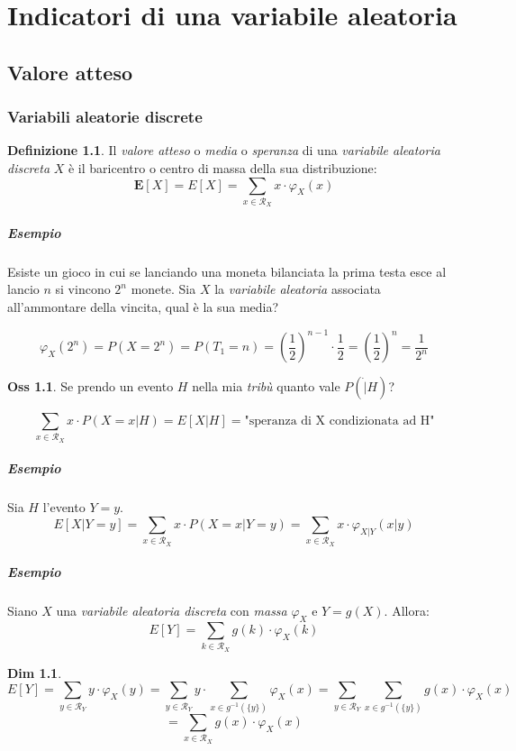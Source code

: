 \documentclass[12pt, a4paper]{report}
\theoremstyle{definition}
\newtheorem{definition}{Definizione}[section]
\newtheorem*{demonstration}{Dim}
\newtheorem*{observation}{Oss}
\DeclareRobustCommand{\supp}{\mathcal{R}}%
\begin{document}
\chapter{Indicatori di una variabile aleatoria}

\section{Valore atteso}
\subsection{Variabili aleatorie discrete}

\begin{definition}
	Il \emph{valore atteso} o \emph{media} o \emph{speranza} di una \emph{variabile
	aleatoria discreta} $X$ è il baricentro o centro di massa della sua
	distribuzione:
	\[\textbf{E}[X]=E[X]=\sum_{x\in\supp_X}x\cdot \varphi_X(x)\]
\end{definition}

\paragraph*{Esempio}
Esiste un gioco in cui se lanciando una moneta bilanciata la prima testa esce al
lancio $n$ si vincono $2^n$ monete. Sia $X$ la \emph{variabile aleatoria}
associata all'ammontare della vincita, qual è la sua media?

\[\varphi_X(2^n)=P(X=2^n)=P(T_1=n)=\left(\frac{1}{2}\right)^{n-1}\cdot \frac{1}{2}=
\left(\frac{1}{2}\right)^n=\frac{1}{2^n}\]

\begin{observation}
	Se prendo un evento $H$ nella mia \emph{tribù} quanto vale \(P(\dot|H)\)?

	\[\sum_{x\in\supp_X}x\cdot P(X=x|H)=E[X|H]=\text{"speranza di X condizionata ad H"}\]
\end{observation}
\paragraph*{Esempio}
Sia $H$ l'evento $Y=y$.
\[E[X|Y=y]=\sum_{x\in\supp_X}x\cdot P(X=x|Y=y)=\sum_{x\in\supp_X}x\cdot \varphi_{X|Y}(x|y)\]

\paragraph*{Esempio}
Siano $X$ una \emph{variabile aleatoria discreta} con \emph{massa} $\varphi_X$ e
\(Y=g(X)\). Allora:
\[E[Y]=\sum_{k\in\supp_X}g(k)\cdot \varphi_X(k)\]
\begin{demonstration}
	\[E[Y]=\sum_{y\in\supp_Y}y\cdot \varphi_X(y)=\sum_{y\in\supp_Y}y\cdot \sum_{x\in g^{-1}
	(\{y\})}\varphi_X(x)=\sum_{y\in\supp_Y}\sum_{x\in g^{-1}(\{y\})}g(x)\cdot \varphi_X(x)\]
	\[=\sum_{x\in\supp_X}g(x)\cdot \varphi_X(x)\]
\end{demonstration}
\end{document}
